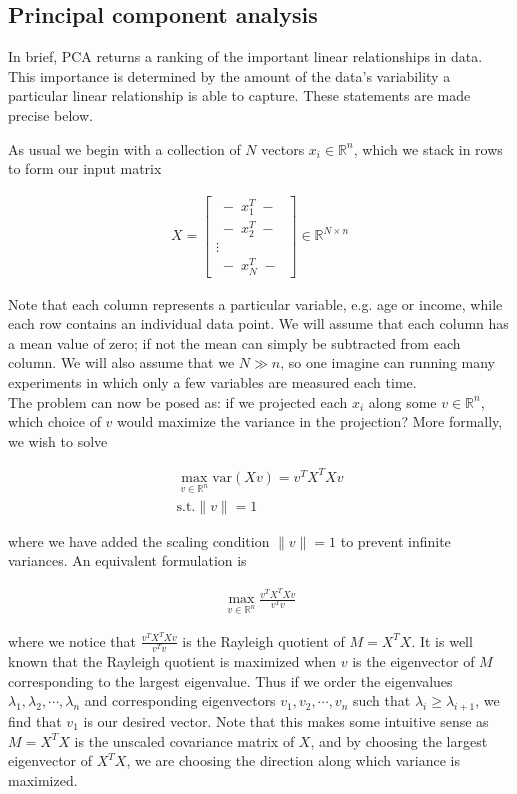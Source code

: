 \subsection{Principal component analysis\label{sec:ml:pca}}

In brief, PCA returns a ranking of the important linear relationships
in data. This importance is determined by the amount of the data's
variability a particular linear relationship is able to capture. These
statements are made precise below.

As usual we begin with a collection of $N$ vectors $x_i \in \mathbb{R}^n$,
which we stack in rows to form our input matrix

\begin{align}
  X = \begin{bmatrix} \; - \; x_1^T \; - \; \\ \; - \; x_2^T \; - \; \\ \vdots \\ \; - \; x_N^T
    \; - \; \end{bmatrix} \in \mathbb{R}^{N \times n}
\end{align}

Note that each column represents a particular variable, e.g. age or
income, while each row contains an individual data point. We will
assume that each column has a mean value of zero; if not the mean can
simply be subtracted from each column. We will also assume that we
$N \gg n$, so one imagine can running many experiments in which only a
few variables are measured each time. \\

The problem can now be posed
as: if we projected each $x_i$ along some $v \in \mathbb{R}^n$, which
choice of $v$ would maximize the variance in the projection? More
formally, we wish to solve

\begin{align}
  \max_{v \in \mathbb{R}^n} \mathrm{var}(Xv) = v^TX^TXv \\
  \mathrm{s.t.} \| v \| = 1
\end{align}

where we have added the scaling condition $\| v \| = 1$ to prevent
infinite variances. An equivalent formulation is 

\begin{align}
  \max_{v \in \mathbb{R}^n} \frac{v^TX^TXv}{v^Tv}
\end{align}

where we notice that $\frac{v^TX^TXv}{v^Tv}$ is the Rayleigh quotient
of $M = X^TX$. It is well known that the Rayleigh quotient is
maximized when $v$ is the eigenvector of $M$ corresponding to the
largest eigenvalue. Thus if we order the eigenvalues
$\lambda_1, \lambda_2, \cdots, \lambda_n$ and corresponding
eigenvectors $v_1, v_2, \cdots, v_n$ such that
$\lambda_i \ge \lambda_{i+1}$, we find that $v_1$ is our desired
vector. Note that this makes some intuitive sense as $M = X^TX$ is the
unscaled covariance matrix of $X$, and by choosing the largest
eigenvector of $X^TX$, we are choosing the direction along which
variance is maximized. \\

